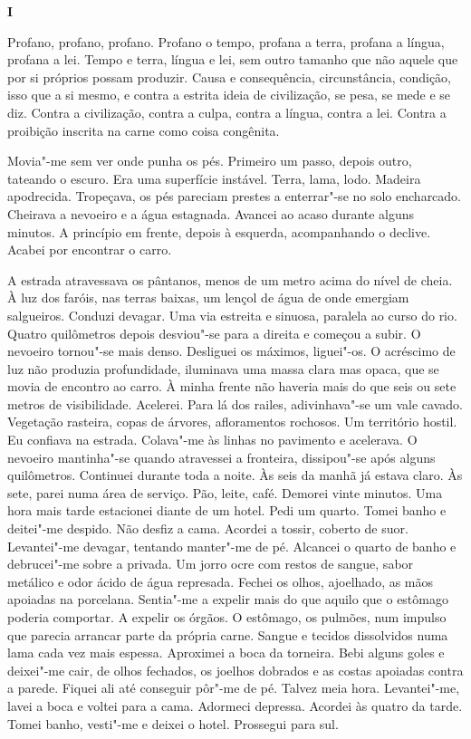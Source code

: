 
\vspace*{1.8cm}
\noindent{}\textbf{I}

\bigskip

Profano, profano, profano. Profano o tempo, profana a terra, profana a
língua, profana a lei. Tempo e terra, língua e lei, sem outro tamanho
que não aquele que por si próprios possam produzir. Causa e
consequência, circunstância, condição, isso que a si mesmo, e contra a
estrita ideia de civilização, se pesa, se mede e se diz. Contra a
civilização, contra a culpa, contra a língua, contra a lei. Contra a
proibição inscrita na carne como coisa congênita.

Movia"-me sem ver onde punha os pés. Primeiro um passo, depois outro,
tateando o escuro. Era uma superfície instável. Terra, lama, lodo.
Madeira apodrecida. Tropeçava, os pés pareciam prestes a enterrar"-se no
solo encharcado. Cheirava a nevoeiro e a água estagnada. Avancei ao
acaso durante alguns minutos. A princípio em frente, depois à esquerda,
acompanhando o declive. Acabei por encontrar o carro.

A estrada atravessava os pântanos, menos de um metro acima do nível de
cheia. À luz dos faróis, nas terras baixas, um lençol de água de onde
emergiam salgueiros. Conduzi devagar. Uma via estreita e sinuosa,
paralela ao curso do rio. Quatro quilômetros depois desviou"-se para a
direita e começou a subir. O nevoeiro tornou"-se mais denso. Desliguei
os máximos, liguei"-os. O acréscimo de luz não produzia profundidade,
iluminava uma massa clara mas opaca, que se movia de encontro ao carro.
À minha frente não haveria mais do que seis ou sete metros de
visibilidade. Acelerei. Para lá dos railes, adivinhava"-se um vale
cavado. Vegetação rasteira, copas de árvores, afloramentos rochosos. Um
território hostil. Eu confiava na estrada. Colava"-me às linhas no
pavimento e acelerava. O nevoeiro mantinha"-se quando atravessei a
fronteira, dissipou"-se após alguns quilômetros. Continuei durante toda
a noite. Às seis da manhã já estava claro. Às sete, parei numa área de
serviço. Pão, leite, café. Demorei vinte minutos. Uma hora mais tarde
estacionei diante de um hotel. Pedi um quarto. Tomei banho e deitei"-me
despido. Não desfiz a cama. Acordei a tossir, coberto de suor.
Levantei"-me devagar, tentando manter"-me de pé. Alcancei o quarto de
banho e debrucei"-me sobre a privada. Um jorro ocre com restos de sangue,
sabor metálico e odor ácido de água represada. Fechei os olhos,
ajoelhado, as mãos apoiadas na porcelana. Sentia"-me a expelir mais do
que aquilo que o estômago poderia comportar. A expelir os órgãos. O
estômago, os pulmões, num impulso que parecia arrancar parte da própria
carne. Sangue e tecidos dissolvidos numa lama cada vez mais espessa.
Aproximei a boca da torneira. Bebi alguns goles e deixei"-me cair, de
olhos fechados, os joelhos dobrados e as costas apoiadas contra a
parede. Fiquei ali até conseguir pôr"-me de pé. Talvez meia hora.
Levantei"-me, lavei a boca e voltei para a cama. Adormeci depressa.
Acordei às quatro da tarde. Tomei banho, vesti"-me e deixei o hotel.
Prossegui para sul.

